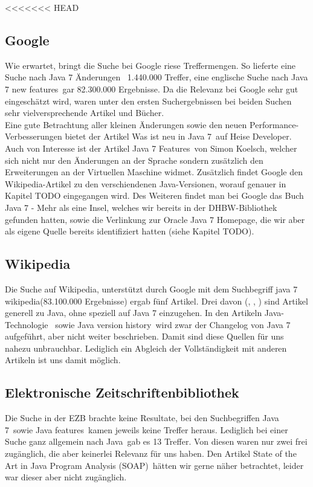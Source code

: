 <<<<<<< HEAD
\subsection{Google}
Wie erwartet, bringt die Suche bei Google riese Treffermengen. So lieferte eine Suche nach \glqq Java 7 Änderungen\grqq~
1.440.000 Treffer, eine englische Suche nach \glqq Java 7 new features\grqq~gar 82.300.000 Ergebnisse. Da die Relevanz bei
Google sehr gut eingeschätzt wird, waren unter den ersten Suchergebnissen bei beiden Suchen sehr vielversprechende Artikel
und Bücher.\\

Eine gute Betrachtung aller kleinen Änderungen sowie den neuen Performance-Verbesserungen bietet der Artikel
\glqq Was ist neu in Java 7\grqq\cite{heiseWasistNeu}~auf Heise Developer.
Auch von Interesse ist der Artikel \glqq Java 7 Features\grqq\cite{blogJava7Features}~von Simon Koelsch, welcher sich nicht nur
den Änderungen an der Sprache sondern zusätzlich den Erweiterungen an der Virtuellen Maschine widmet.
Zusätzlich findet Google den Wikipedia-Artikel zu den verschiendenen Java-Versionen, worauf genauer in Kapitel TODO eingegangen wird.
Des Weiteren findet man bei Google das Buch \glqq Java 7 - Mehr als eine Insel\grqq\cite{javainsel2}, welches wir bereits in der
DHBW-Bibliothek gefunden hatten, sowie die Verlinkung zur Oracle Java 7 Homepage, die wir aber als eigene Quelle bereits
identifiziert hatten (siehe Kapitel TODO).

\subsection{Wikipedia}
Die Suche auf Wikipedia, unterstützt durch Google mit dem Suchbegriff \glqq java 7 wikipedia\grqq (83.100.000 Ergebnisse) ergab
fünf Artikel. Drei davon (\cite{wikiJavaSoftwarePlatform}, \cite{wikiJavaProgrammiersprache}, \cite{wikiJavaStandardEdition})
sind Artikel generell zu Java, ohne speziell auf Java 7 einzugehen. In den Artikeln \glqq Java-Technologie\grqq\cite{wikiJavaTechnologie}
~sowie \glqq Java version history\grqq\cite{wikiJavaVersionHistory}~wird zwar der Changelog von Java 7 aufgeführt, aber nicht
weiter beschrieben. Damit sind diese Quellen für uns nahezu unbrauchbar. Lediglich ein Abgleich der Vollständigkeit mit anderen
Artikeln ist uns damit möglich.

\subsection{Elektronische Zeitschriftenbibliothek}
Die Suche in der EZB brachte keine Resultate, bei den Suchbegriffen \glqq Java 7\grqq~sowie \glqq Java features\grqq~kamen
jeweils keine Treffer heraus. Lediglich bei einer Suche ganz allgemein nach \glqq Java\grqq~gab es 13 Treffer. Von diesen waren
nur zwei frei zugänglich, die aber keinerlei Relevanz für uns haben. Den Artikel \glqq State of the Art in Java Program Analysis
(SOAP)\grqq~hätten wir gerne näher betrachtet, leider war dieser aber nicht zugänglich.

